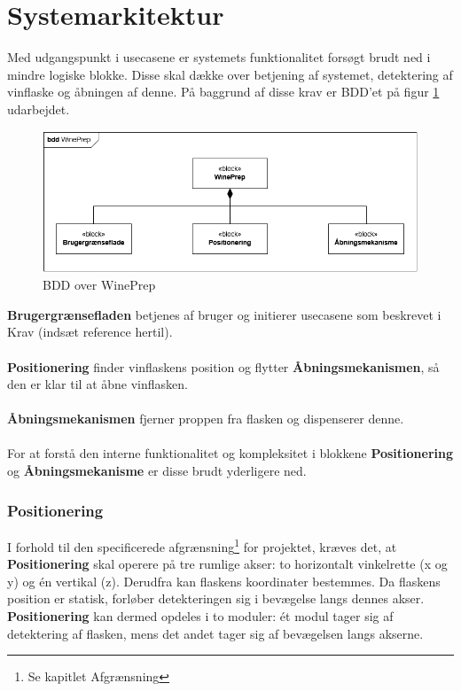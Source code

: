 \section{Systemarkitektur}
Med udgangspunkt i usecasene er systemets funktionalitet forsøgt brudt ned i mindre logiske blokke. Disse skal dække over betjening af systemet, detektering af vinflaske og åbningen af denne. På baggrund af disse krav er BDD'et på figur \ref{BDD_WinePrep} udarbejdet.

\begin{figure}[H]
	\centerline{\includegraphics[scale=0.33]{tex/Arkitektur/Diagrammer/BDD_WinePrep}}
	\caption{BDD over WinePrep}
	\label{BDD_WinePrep}
\end{figure}

\noindent\textbf{Brugergrænsefladen} betjenes af bruger og initierer usecasene som beskrevet i Krav (indsæt reference hertil).
\\
\\
\textbf{Positionering} finder vinflaskens position og flytter \textbf{Åbningsmekanismen}, så den er klar til at åbne vinflasken.
\\
\\
\textbf{Åbningsmekanismen} fjerner proppen fra flasken og dispenserer denne.
\\
\\
For at forstå den interne funktionalitet og kompleksitet i blokkene \textbf{Positionering} og \textbf{Åbningsmekanisme} er disse brudt yderligere ned.

\subsubsection{Positionering}
I forhold til den specificerede afgrænsning\footnote{Se kapitlet Afgrænsning} for projektet, kræves det, at \textbf{Positionering} skal operere på tre rumlige akser: to horizontalt vinkelrette (x og y) og én vertikal (z). Derudfra kan flaskens koordinater bestemmes. Da flaskens position er statisk, forløber detekteringen sig i bevægelse langs dennes akser. \textbf{Positionering} kan dermed opdeles i to moduler: ét modul tager sig af detektering af flasken, mens det andet tager sig af bevægelsen langs akserne.

